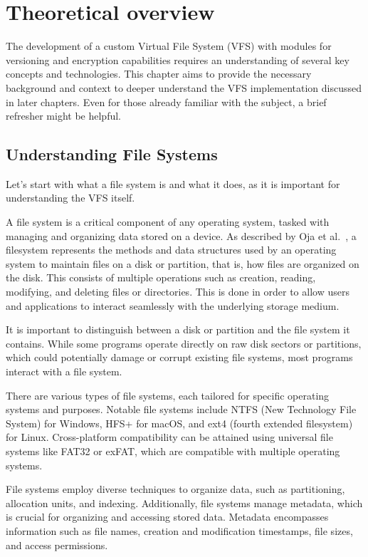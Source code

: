 \chapter{Theoretical overview}
\label{chap:refs}

The development of a custom Virtual File System (VFS) with modules for versioning and encryption capabilities requires an understanding of several key concepts and technologies.
This chapter aims to provide the necessary background and context to deeper understand the VFS implementation discussed in later chapters.
Even for those already familiar with the subject, a brief refresher might be helpful.


\section{Understanding File Systems}\label{sec:file-systems}

Let's start with what a file system is and what it does, as it is important for understanding the VFS itself.

A file system is a critical component of any operating system, tasked with managing and organizing data stored on a device.
As described by Oja et al.~\cite{oja-fs}, a filesystem represents the methods and data structures used by an operating system to maintain files on a disk or partition, that is, how files are organized on the disk.
This consists of multiple operations such as creation, reading, modifying, and deleting files or directories.
This is done in order to allow users and applications to interact seamlessly with the underlying storage medium.

It is important to distinguish between a disk or partition and the file system it contains.
While some programs operate directly on raw disk sectors or partitions, which could potentially damage or corrupt existing file systems, most programs interact with a file system.

There are various types of file systems, each tailored for specific operating systems and purposes.
Notable file systems include NTFS (New Technology File System) for Windows, HFS+ for macOS, and ext4 (fourth extended filesystem) for Linux.
Cross-platform compatibility can be attained using universal file systems like FAT32 or exFAT, which are compatible with multiple operating systems.

File systems employ diverse techniques to organize data, such as partitioning, allocation units, and indexing.
Additionally, file systems manage metadata, which is crucial for organizing and accessing stored data.
Metadata encompasses information such as file names, creation and modification timestamps, file sizes, and access permissions.


